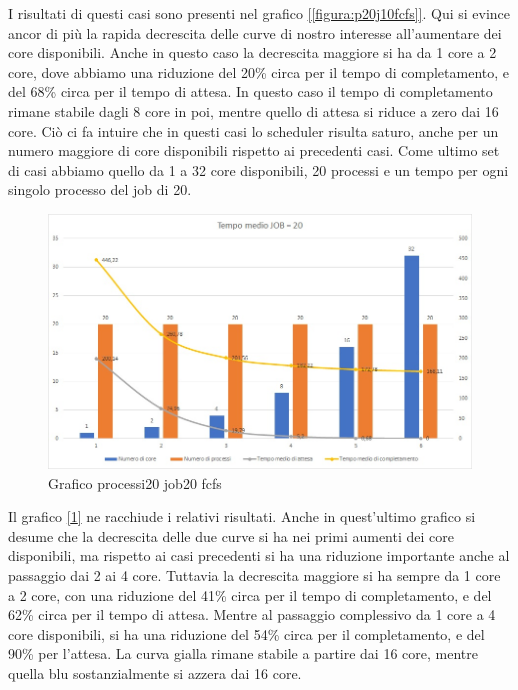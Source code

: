 \documentclass[Lau, oneside]{sapthesis}%
\begin{document}
I risultati di questi casi sono presenti nel grafico \hyperref[figura:p20j10fcfs]{[\ref*{figura:p20j10fcfs}]}.
Qui si evince ancor di più la rapida decrescita delle curve di nostro interesse all'aumentare dei core disponibili.
Anche in questo caso la decrescita maggiore si ha da 1 core a 2 core, dove abbiamo una riduzione del 20\% circa per il tempo di completamento, e del 68\% circa per il tempo di attesa.
In questo caso il tempo di completamento rimane stabile dagli 8 core in poi, mentre quello di attesa si riduce a zero dai 16 core.
Ciò ci fa intuire che in questi casi lo scheduler risulta saturo, anche per un numero maggiore di core disponibili rispetto ai precedenti casi.
Come ultimo set di casi abbiamo quello da 1 a 32 core disponibili, 20 processi e un tempo per ogni singolo processo del job di 20.
\begin{figure}[ht!]
  \centering
  \includegraphics[width=1\textwidth]{Grafico processi20 job20 fcfs.jpg}
  \caption{Grafico processi20 job20 fcfs}
  \label{figura:p20j20fcfs}
\end{figure}
Il grafico \hyperref[figura:p20j20fcfs]{[\ref*{figura:p20j20fcfs}]} ne racchiude i relativi risultati.
Anche in quest'ultimo grafico si desume che la decrescita delle due curve si ha nei primi aumenti dei core disponibili, ma rispetto ai casi precedenti si ha una riduzione importante anche al passaggio dai 2 ai 4 core.
Tuttavia la decrescita maggiore si ha sempre da 1 core a 2 core, con una riduzione del 41\% circa per il tempo di completamento, e del 62\% circa per il tempo di attesa.
Mentre al passaggio complessivo da 1 core a 4 core disponibili, si ha una riduzione del 54\% circa per il completamento, e del 90\% per l'attesa.
La curva gialla rimane stabile a partire dai 16 core, mentre quella blu sostanzialmente si azzera dai 16 core.
\end{document}
